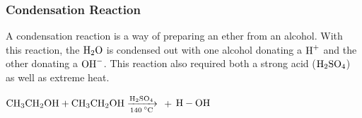 \documentclass[12pt, a4paper]{article}
\begin{document}
    \subsubsection{Condensation Reaction}

    A condensation reaction is a way of preparing an ether from an alcohol. With this reaction, 
    the $\ce{H2O}$ is condensed out with one alcohol donating a $\ce{H+}$ and the other donating
    a $\ce{OH-}$. This reaction also required both a strong acid ($\ce{H2SO4}$) as well as extreme 
    heat. 

    \begin{center}
        $\ce{CH3CH2OH + CH3CH2OH ->[\ce{H2SO4}][140^{\circ}\text{C}]}$  + $\ce{H - OH}$
    \end{center}
\end{document}
